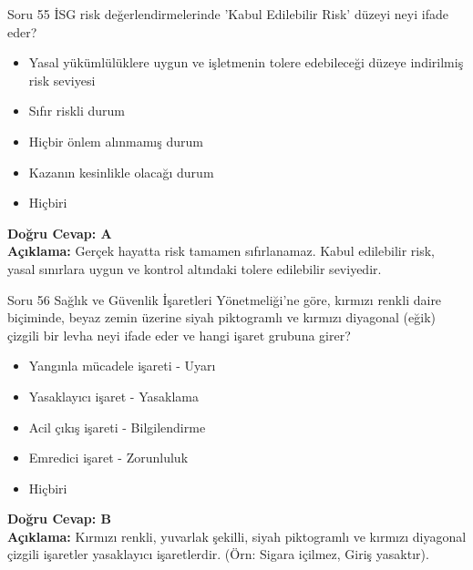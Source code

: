 \documentclass[12pt,a4paper]{article}
\begin{document}
\begin{testcard}{Soru 55}
    İSG risk değerlendirmelerinde 'Kabul Edilebilir Risk' düzeyi neyi ifade eder?
    \begin{itemize}
        \item[A)] Yasal yükümlülüklere uygun ve işletmenin tolere edebileceği düzeye indirilmiş risk seviyesi
        \item[B)] Sıfır riskli durum
        \item[C)] Hiçbir önlem alınmamış durum
        \item[D)] Kazanın kesinlikle olacağı durum
        \item[E)] Hiçbiri
    \end{itemize}
    \tcblower
    \textbf{Doğru Cevap: A} \\
    \textbf{Açıklama:} Gerçek hayatta risk tamamen sıfırlanamaz. Kabul edilebilir risk, yasal sınırlara uygun ve kontrol altındaki tolere edilebilir seviyedir.
\end{testcard}

\begin{testcard}{Soru 56}
    Sağlık ve Güvenlik İşaretleri Yönetmeliği'ne göre, kırmızı renkli daire biçiminde, beyaz zemin üzerine siyah piktogramlı ve kırmızı diyagonal (eğik) çizgili bir levha neyi ifade eder ve hangi işaret grubuna girer?
    \begin{itemize}
        \item[A)] Yangınla mücadele işareti - Uyarı
        \item[B)] Yasaklayıcı işaret - Yasaklama
        \item[C)] Acil çıkış işareti - Bilgilendirme
        \item[D)] Emredici işaret - Zorunluluk
        \item[E)] Hiçbiri
    \end{itemize}
    \tcblower
    \textbf{Doğru Cevap: B} \\
    \textbf{Açıklama:} Kırmızı renkli, yuvarlak şekilli, siyah piktogramlı ve kırmızı diyagonal çizgili işaretler yasaklayıcı işaretlerdir. (Örn: Sigara içilmez, Giriş yasaktır).
\end{testcard}
\end{document}
